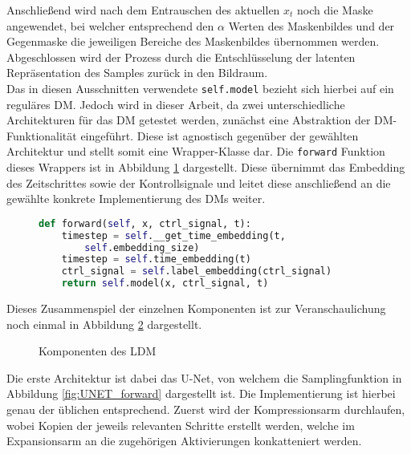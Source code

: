 Anschließend wird nach dem Entrauschen des aktuellen $x_t$ noch die Maske angewendet, bei welcher entsprechend den $\alpha$ Werten des Maskenbildes und der Gegenmaske die jeweiligen Bereiche des Maskenbildes übernommen werden. \\
Abgeschlossen wird der Prozess durch die Entschlüsselung der latenten Repräsentation des Samples zurück in den Bildraum. \\
Das in diesen Ausschnitten verwendete \texttt{self.model} bezieht sich hierbei auf ein reguläres \ac{DM}. Jedoch wird in dieser Arbeit, da zwei unterschiedliche Architekturen für das DM getestet werden, zunächst eine Abstraktion der DM-Funktionalität eingeführt. Diese ist agnostisch gegenüber der gewählten Architektur und stellt somit eine Wrapper-Klasse dar. Die \texttt{forward} Funktion dieses Wrappers ist in Abbildung \ref{fig:DM_forward} dargestellt. Diese übernimmt das Embedding des Zeitschrittes sowie der Kontrollsignale und leitet diese anschließend an die gewählte konkrete Implementierung des \ac{DM}s weiter. \\
\begin{figure}[H]
\begin{lstlisting}[language=python]
def forward(self, x, ctrl_signal, t):
    timestep = self.__get_time_embedding(t, 
        self.embedding_size)
    timestep = self.time_embedding(t)
    ctrl_signal = self.label_embedding(ctrl_signal)
    return self.model(x, ctrl_signal, t)
\end{lstlisting}
    \captionsetup{type=figure}
    \label{fig:DM_forward}
\end{figure}
Dieses Zusammenspiel der einzelnen Komponenten ist zur Veranschaulichung noch einmal in Abbildung \ref{fig:LDM_arch} dargestellt.
\begin{figure}[htbp]
    \centering
    \caption{Komponenten des \ac{LDM}}
    \label{fig:LDM_arch}
\end{figure}
Die erste Architektur ist dabei das U-Net, von welchem die Samplingfunktion in Abbildung \ref{fig:UNET_forward} dargestellt ist. Die Implementierung ist hierbei genau der üblichen entsprechend. Zuerst wird der Kompressionsarm durchlaufen, wobei Kopien der jeweils relevanten Schritte erstellt werden, welche im Expansionsarm an die zugehörigen Aktivierungen konkatteniert werden.  
